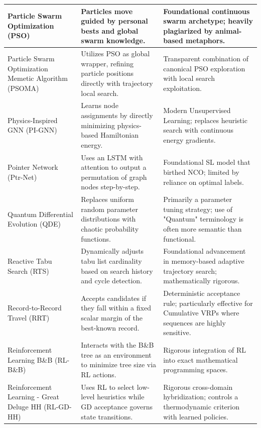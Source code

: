 \begin{center}
\begin{longtable}{
  >{\raggedright\arraybackslash}p{}
  >{\raggedright\arraybackslash}p{}
  >{\raggedright\arraybackslash}p{}
}
Particle Swarm Optimization (PSO) & Particles move guided by personal bests and global swarm knowledge. & Foundational continuous swarm archetype; heavily plagiarized by animal-based metaphors. \\ \midrule

Particle Swarm Optimization Memetic Algorithm (PSOMA) & Utilizes PSO as global wrapper, refining particle positions directly with trajectory local search. & Transparent combination of canonical PSO exploration with local search exploitation. \\ \midrule

Physics-Inspired GNN (PI-GNN) & Learns node assignments by directly minimizing physics-based Hamiltonian energy. & Modern Unsupervised Learning; replaces heuristic search with continuous energy gradients. \\ \midrule

Pointer Network (Ptr-Net) & Uses an LSTM with attention to output a permutation of graph nodes step-by-step. & Foundational SL model that birthed NCO; limited by reliance on optimal labels. \\ \midrule

Quantum Differential Evolution (QDE) & Replaces uniform random parameter distributions with chaotic probability functions. & Primarily a parameter tuning strategy; use of "Quantum" terminology is often more semantic than functional. \\ \midrule

Reactive Tabu Search (RTS) & Dynamically adjusts tabu list cardinality based on search history and cycle detection. & Foundational advancement in memory-based adaptive trajectory search; mathematically rigorous. \\ \midrule

Record-to-Record Travel (RRT) & Accepts candidates if they fall within a fixed scalar margin of the best-known record. & Deterministic acceptance rule; particularly effective for Cumulative VRPs where sequences are highly sensitive. \\ \midrule

Reinforcement Learning B\&B (RL-B\&B) & Interacts with the B\&B tree as an environment to minimize tree size via RL actions. & Rigorous integration of RL into exact mathematical programming spaces. \\ \midrule

Reinforcement Learning - Great Deluge HH (RL-GD-HH) & Uses RL to select low-level heuristics while GD acceptance governs state transitions. & Rigorous cross-domain hybridization; controls a thermodynamic criterion with learned policies. \\ \midrule


\end{longtable}
\end{center}
